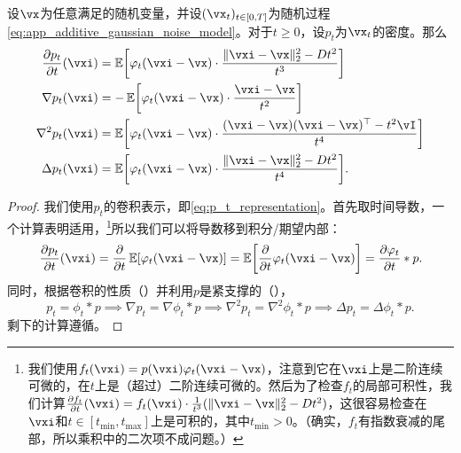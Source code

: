 \documentclass[../../book-main_zh.tex]{subfiles}
\begin{document}
\begin{proposition}\label{prop:p_t_derivatives}
    设\(\vx\)为任意满足的随机变量，并设\((\vx_{t})_{t \in [0, T]}\)为随机过程\eqref{eq:app_additive_gaussian_noise_model}。对于\(t \geq 0\)，设\(p_{t}\)为\(\vx_{t}\)的密度。那么
    \begin{align}
        \pdv{p_{t}}{t}(\vxi)
        &= \Ex\rs{\phi_{t}(\vxi - \vx)\cdot\frac{\norm{\vxi - \vx}_{2}^{2} - Dt^{2}}{t^{3}}} \\
        \nabla p_{t}(\vxi)
        &= -\Ex\rs{\phi_{t}(\vxi - \vx)\cdot\frac{\vxi - \vx}{t^{2}}} \\
        \nabla^{2}p_{t}(\vxi)
        &= \Ex\rs{\phi_{t}(\vxi - \vx)\cdot\frac{(\vxi - \vx)(\vxi - \vx)^{\top} - t^{2}\vI}{t^{4}}} \\ 
        \Delta p_{t}(\vxi)
        &= \Ex\rs{\phi_{t}(\vxi - \vx)\cdot\frac{\norm{\vxi - \vx}_{2}^{2} - Dt^{2}}{t^{4}}}.
    \end{align}
\end{proposition}
\begin{proof} 
    我们使用\(p_{t}\)的卷积表示，即\eqref{eq:p_t_representation}。首先取时间导数，一个计算表明适用，\footnote{我们使用\(f_{t}(\vxi) = p(\vxi) \phi_{t}(\vxi - \vx)\)，注意到它在\(\vxi\)上是二阶连续可微的，在\(t\)上是（超过）二阶连续可微的。然后为了检查\(f_{t}\)的局部可积性，我们计算\(\pdv{f_{t}}{t}(\vxi) = f_{t}(\vxi)\cdot \frac{1}{t^{3}}(\norm{\vxi - \vx}_{2}^{2} - Dt^{2})\)，这很容易检查在\(\vxi\)和\(t \in [t_{\min}, t_{\max}]\)上是可积的，其中\(t_{\min} > 0\)。（确实，\(f_{t}\)有指数衰减的尾部，所以乘积中的二次项不成问题。）}所以我们可以将导数移到积分/期望内部：
    \begin{equation}
        \pdv{p_{t}}{t}(\vxi) = \pdv*{\Ex[\phi_{t}(\vxi - \vx)]}{t} = \Ex\rs{\pdv*{\phi_{t}(\vxi - \vx)}{t}} = \pdv{\phi_{t}}{t} * p.
    \end{equation}
    同时，根据卷积的性质（）并利用\(p\)是紧支撑的（），
    \begin{equation}
        p_{t} = \phi_{t} * p \implies \nabla p_{t} = \nabla \phi_{t} * p \implies \nabla^{2}p_{t} = \nabla^{2}\phi_{t} * p \implies \Delta p_{t} = \Delta \phi_{t} * p.
    \end{equation}
    剩下的计算遵循。
\end{proof}
\end{document}
